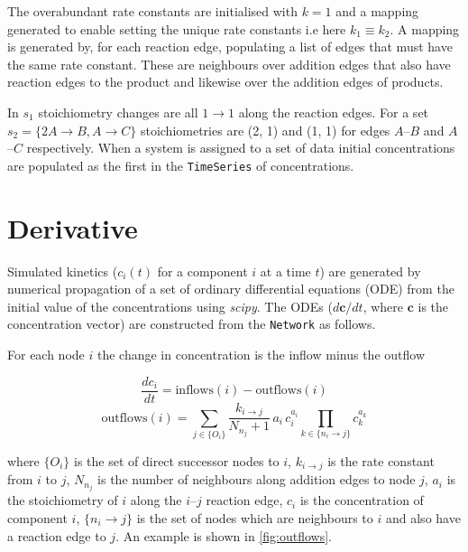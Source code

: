 \documentclass[9.5pt]{article}
\newcommand{\code}[1]{\texttt{#1}}
\begin{document}
 The overabundant rate constants are initialised with $k = 1$ and a mapping generated to enable setting the unique rate constants i.e here $k_1 \equiv k_2$. A mapping is generated by, for each reaction edge, populating a list of edges that must have the same rate constant. These are neighbours over addition edges that also have reaction edges to the product and likewise over the addition edges of products.
 
 In $s_1$ stoichiometry changes are all $1 \rightarrow 1$ along the reaction edges. For a set $s_2 = \{2A \rightarrow B, A \rightarrow C\}$ stoichiometries are (2, 1) and (1, 1) for edges $A$--$B$ and $A$--$C$ respectively. When a system is assigned to a set of data initial concentrations are populated as the first in the \code{TimeSeries} of concentrations.

\section{Derivative}

Simulated kinetics ($c_i(t)$ for a component $i$ at a time $t$) are generated by numerical propagation of a set of ordinary differential equations (ODE) from the initial value of the concentrations using \emph{scipy}. The ODEs ($d\boldsymbol{c}/dt$, where $\boldsymbol{c}$ is the concentration vector) are constructed from the \code{Network} as follows.

For each node $i$ the change in concentration is the inflow minus the outflow

\begin{equation}
\frac{d c_i}{dt} = \text{inflows}(i) - \text{outflows}(i)
\end{equation}
\begin{equation}
\text{outflows}(i) = \sum_{j \in \{O_i\}} \frac{k_{i\rightarrow j}}{N_{n_j} + 1}\, a_i \,c_i^{a_i}\prod_{k \in \{n_i\rightarrow j\}} c_k^{a_k}
\end{equation}

where $\{O_i\}$ is the set of direct successor nodes to $i$, $k_{i \rightarrow j}$ is the rate constant from $i$ to $j$, $N_{n_j}$ is the number of neighbours along addition edges to node $j$, $a_i$ is the stoichiometry of $i$ along the $i$--$j$ reaction edge,  $c_i$ is the concentration of component $i$, $\{n_i \rightarrow j\}$ is the set of nodes which are neighbours to $i$ and also have a reaction edge to $j$. An example is shown in \figurename{ \ref{fig:outflows}}.
\end{document}

